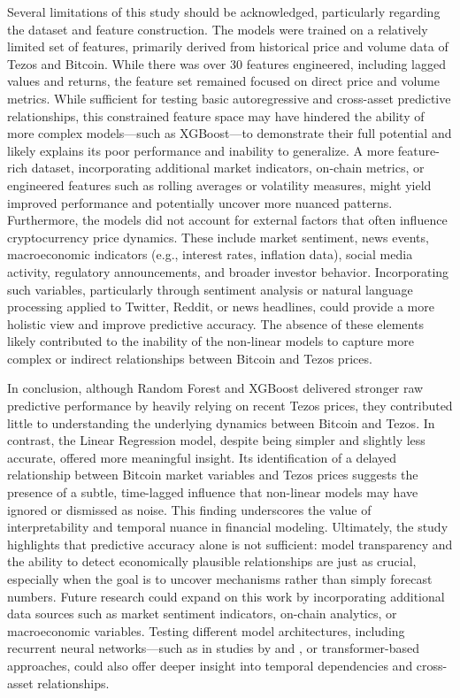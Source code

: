 Several limitations of this study should be acknowledged, particularly regarding the dataset and feature construction. 
The models were trained on a relatively limited set of features, primarily derived from historical price and volume data of Tezos and Bitcoin. While there was over 30 features engineered, including lagged values and returns, the feature set remained focused on direct price and volume metrics. 
While sufficient for testing basic autoregressive and cross-asset predictive relationships, this constrained feature space may have hindered the ability of more complex models—such as XGBoost—to demonstrate their full potential and likely explains its poor performance and inability to generalize. 
A more feature-rich dataset, incorporating additional market indicators, on-chain metrics, or engineered features such as rolling averages or volatility measures, might yield improved performance and potentially uncover more nuanced patterns.
Furthermore, the models did not account for external factors that often influence cryptocurrency price dynamics. These include market sentiment, news events, macroeconomic indicators (e.g., interest rates, inflation data), social media activity, regulatory announcements, and broader investor behavior. Incorporating such variables, particularly through sentiment analysis or natural language processing applied to Twitter, Reddit, or news headlines, could provide a more holistic view and improve predictive accuracy. 
The absence of these elements likely contributed to the inability of the non-linear models to capture more complex or indirect relationships between Bitcoin and Tezos prices.

In conclusion, although Random Forest and XGBoost delivered stronger raw predictive performance by heavily relying on recent Tezos prices, they contributed little to understanding the underlying dynamics between Bitcoin and Tezos. 
In contrast, the Linear Regression model, despite being simpler and slightly less accurate, offered more meaningful insight. Its identification of a delayed relationship between Bitcoin market variables and Tezos prices suggests the presence of a subtle, time-lagged influence that non-linear models may have ignored or dismissed as noise. 
This finding underscores the value of interpretability and temporal nuance in financial modeling. Ultimately, the study highlights that predictive accuracy alone is not sufficient: model transparency and the ability to detect economically plausible relationships are just as crucial, especially when the goal is to uncover mechanisms rather than simply forecast numbers.
Future research could expand on this work by incorporating additional data sources such as market sentiment indicators, on-chain analytics, or macroeconomic variables. 
Testing different model architectures, including recurrent neural networks—such as in studies by \textcite{mishal2022prediction} and \textcite{mallqui2019predicting},  or transformer-based approaches, could also offer deeper insight into temporal dependencies and cross-asset relationships.


